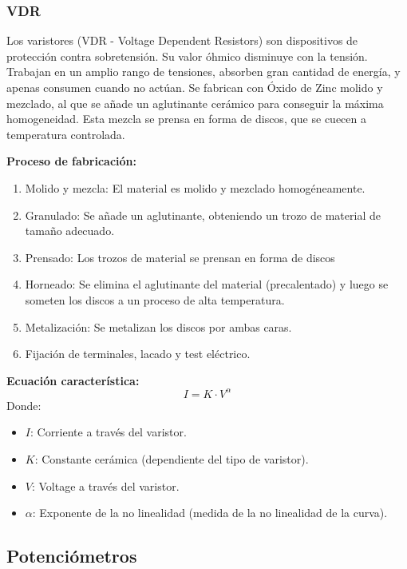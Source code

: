 \subsubsection{VDR}

Los varistores (VDR - Voltage Dependent Resistors) son dispositivos de protección contra sobretensión. Su valor óhmico disminuye con la tensión. Trabajan en un amplio rango de tensiones, absorben gran cantidad de energía, y apenas consumen cuando no actúan. Se fabrican con Óxido de Zinc molido y mezclado, al que se añade un aglutinante cerámico para conseguir la máxima homogeneidad. Esta mezcla se prensa en forma de discos, que se cuecen a temperatura controlada.

\textbf{Proceso de fabricación:}
\begin{enumerate}
    \item Molido y mezcla: El material es molido y mezclado homogéneamente.
    \item Granulado: Se añade un aglutinante, obteniendo un trozo de material de tamaño adecuado.
    \item Prensado: Los trozos de material se prensan en forma de discos
    \item Horneado: Se elimina el aglutinante del material (precalentado) y luego se someten los discos a un proceso de alta temperatura.
    \item Metalización: Se metalizan los discos por ambas caras.
    \item Fijación de terminales, lacado y test eléctrico.
\end{enumerate}

\textbf{Ecuación característica:}
\begin{equation}
    I = K \cdot V^\alpha
\end{equation}
Donde:
\begin{itemize}
    \item $I$: Corriente a través del varistor.
    \item $K$: Constante cerámica (dependiente del tipo de varistor).
    \item $V$: Voltage a través del varistor.
    \item $\alpha$: Exponente de la no linealidad (medida de la no linealidad de la curva).
\end{itemize}

\subsection{Potenciómetros}

